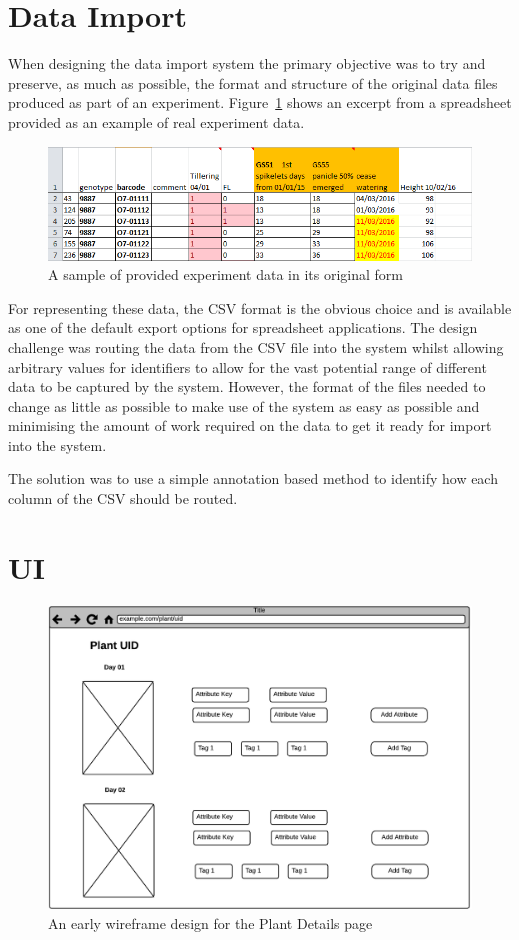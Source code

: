 \section{Data Import}

When designing the data import system the primary objective was to try and preserve, as much as possible, the format and structure of the original data files produced as part of an experiment. Figure~\ref{fig:data1} shows an excerpt from a spreadsheet provided as an example of real experiment data. 

\begin{figure}[H]
    \centering
    \includegraphics[width=\textwidth]{images/design/data1}
    \caption{A sample of provided experiment data in its original form}
    \label{fig:data1}
\end{figure}

For representing these data, the CSV format is the obvious choice and is available as one of the default export options for spreadsheet applications. The design challenge was routing the data from the CSV file into the system whilst allowing arbitrary values for identifiers to allow for the vast potential range of different data to be captured by the system. However, the format of the files needed to change as little as possible to make use of the system as easy as possible and minimising the amount of work required on the data to get it ready for import into the system. 

The solution was to use a simple annotation based method to identify how each column of the CSV should be routed. 
\section{UI}
\begin{figure}[H]
    \centering
    \includegraphics[width=\textwidth]{images/design/ui1}
    \caption{An early wireframe design for the Plant Details page}
    \label{fig:ui1}
\end{figure}

